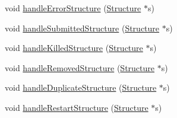\begin{DoxyCompactItemize}
\item 
void \hyperlink{classGlobalSearch_1_1QueueManager_a11c594794b1b96ad8524a88866acac3f}{handle\+Error\+Structure} (\hyperlink{classGlobalSearch_1_1Structure}{Structure} $\ast$s)
\item 
void \hyperlink{classGlobalSearch_1_1QueueManager_a01c36b34d2fc7ca0bf03a929a4da9e4d}{handle\+Submitted\+Structure} (\hyperlink{classGlobalSearch_1_1Structure}{Structure} $\ast$s)
\item 
void \hyperlink{classGlobalSearch_1_1QueueManager_a80e344243b5a701da60d8b7917013fd1}{handle\+Killed\+Structure} (\hyperlink{classGlobalSearch_1_1Structure}{Structure} $\ast$s)
\item 
void \hyperlink{classGlobalSearch_1_1QueueManager_ab715f5753ac932c47facb214573f8b8b}{handle\+Removed\+Structure} (\hyperlink{classGlobalSearch_1_1Structure}{Structure} $\ast$s)
\item 
void \hyperlink{classGlobalSearch_1_1QueueManager_a84149fe85ad675e47950a69d32ad7c6a}{handle\+Duplicate\+Structure} (\hyperlink{classGlobalSearch_1_1Structure}{Structure} $\ast$s)
\item 
void \hyperlink{classGlobalSearch_1_1QueueManager_a81c488f9671a05b9d51eff9c2fc514d6}{handle\+Restart\+Structure} (\hyperlink{classGlobalSearch_1_1Structure}{Structure} $\ast$s)
\end{DoxyCompactItemize}
